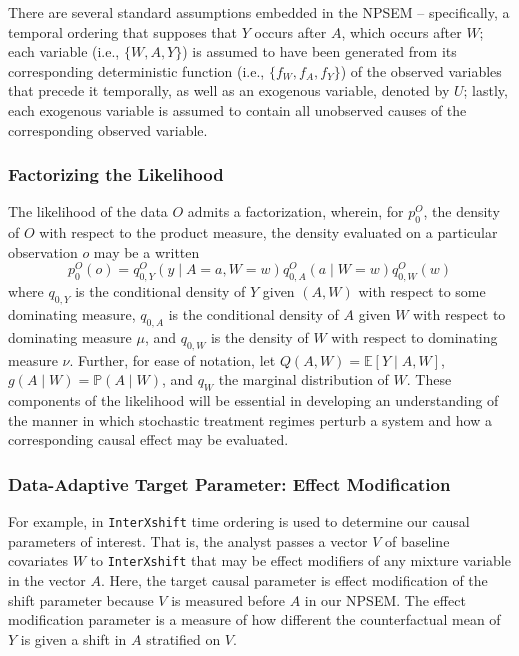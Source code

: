\documentclass[
]{article}
\begin{document}
There are several standard assumptions embedded in the NPSEM --
specifically, a temporal ordering that supposes that \(Y\) occurs after
\(A\), which occurs after \(W\); each variable (i.e., \(\{W, A, Y\}\))
is assumed to have been generated from its corresponding deterministic
function (i.e., \(\{f_W, f_A, f_Y\}\)) of the observed variables that
precede it temporally, as well as an exogenous variable, denoted by
\(U\); lastly, each exogenous variable is assumed to contain all
unobserved causes of the corresponding observed variable.

\hypertarget{factorizing-the-likelihood}{%
\subsubsection{Factorizing the
Likelihood}\label{factorizing-the-likelihood}}

The likelihood of the data \(O\) admits a factorization, wherein, for
\(p_0^O\), the density of \(O\) with respect to the product measure, the
density evaluated on a particular observation \(o\) may be a written
\begin{equation}
  p_0^O(o) = q^O_{0,Y}(y \mid A = a, W = w) q^O_{0,A}(a \mid W = w)
  q^O_{0,W}(w)
\end{equation} where \(q_{0, Y}\) is the conditional density of \(Y\)
given \((A, W)\) with respect to some dominating measure, \(q_{0, A}\)
is the conditional density of \(A\) given \(W\) with respect to
dominating measure \(\mu\), and \(q_{0, W}\) is the density of \(W\)
with respect to dominating measure \(\nu\). Further, for ease of
notation, let \(Q(A, W) = \mathbb{E}[Y \mid A, W]\),
\(g(A \mid W) = \mathbb{P}(A \mid W)\), and \(q_W\) the marginal
distribution of \(W\). These components of the likelihood will be
essential in developing an understanding of the manner in which
stochastic treatment regimes perturb a system and how a corresponding
causal effect may be evaluated.

\hypertarget{data-adaptive-target-parameter-effect-modification}{%
\subsubsection{Data-Adaptive Target Parameter: Effect
Modification}\label{data-adaptive-target-parameter-effect-modification}}

For example, in \texttt{InterXshift} time ordering is used to determine
our causal parameters of interest. That is, the analyst passes a vector
\(V\) of baseline covariates \(W\) to \texttt{InterXshift} that may be
effect modifiers of any mixture variable in the vector \(A\). Here, the
target causal parameter is effect modification of the shift parameter
because \(V\) is measured before \(A\) in our NPSEM. The effect
modification parameter is a measure of how different the counterfactual
mean of \(Y\) is given a shift in \(A\) stratified on \(V\).
\end{document}
